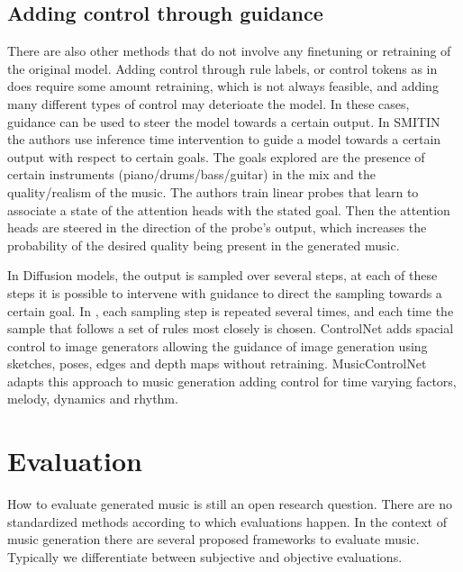 \subsection{Adding control through guidance}
There are also other methods that do not involve any finetuning or retraining of the original model. Adding control through rule labels, or control tokens as in \cite{Rütte_figaro_2023}\cite{Lan_Hsiao_Cheng_Yang_musicongen_2024} does require some amount  retraining, which is not always feasible, and adding many different types of control may deterioate the model. In these cases, guidance can be used to steer the model towards a certain output.
In SMITIN \cite{Koo_Wichern_Germain_SMITIN_2024} the authors use inference time intervention to guide a model towards a certain output with respect to certain goals. The goals explored are the presence of certain instruments (piano/drums/bass/guitar) in the mix and the quality/realism of the music. The authors train linear probes that learn to associate a state of the attention heads with the stated goal. Then the attention heads are steered in the direction of the probe’s output, which increases the probability of the desired quality being present in the generated music.   

In Diffusion models, the output is sampled over several steps, at each of these steps it is possible to intervene with guidance to direct the sampling towards a certain goal. In \cite{Huang_rule_diffusion_2024}, each sampling step is repeated several times, and each time the sample that follows a set of rules most closely is chosen. ControlNet \cite{Zhang_Rao_Agrawala_2023} adds spacial control to image generators allowing the guidance of image generation using sketches, poses, edges and depth maps without retraining. MusicControlNet \cite{musicwellbeing_agres_2021} adapts this approach to music generation adding control for time varying factors, melody, dynamics and rhythm. 


\section{Evaluation} \label{section:evaluation}
How to evaluate generated music is still an open research question. There are no standardized methods according to which evaluations happen\cite{Yin_Reuben_Stepney_Collins_2023}. In the context of music generation there are several proposed frameworks to evaluate music. Typically we differentiate between subjective and objective evaluations.

